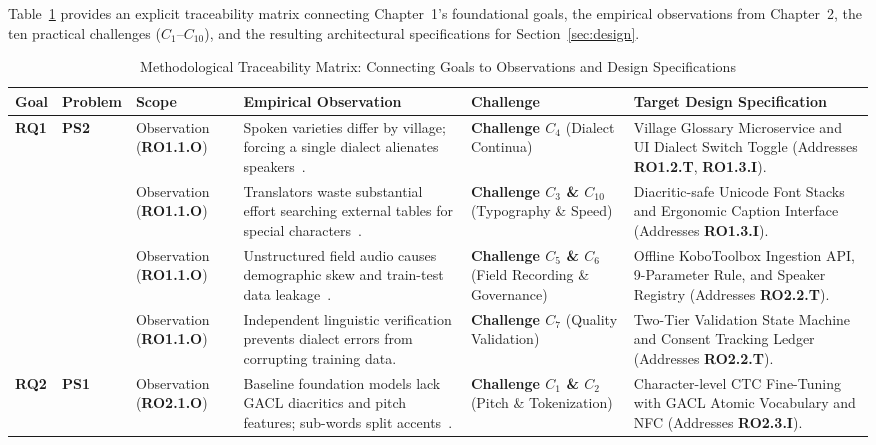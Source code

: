 \documentclass[conference]{IEEEtran}
\begin{document}
Table~\ref{tab:traceability_mapping} provides an explicit traceability matrix connecting Chapter~1's foundational goals, the empirical observations from Chapter~2, the ten practical challenges ($C_1$--$C_{10}$), and the resulting architectural specifications for Section~\ref{sec:design}.

\begin{table}[t]
\centering
\small
\setlength{\tabcolsep}{3.5pt}
\caption{Methodological Traceability Matrix: Connecting Goals to Observations and Design Specifications}
\label{tab:traceability_mapping}
\begin{tabular}{p{1.1cm} p{1.4cm} >{\raggedright\arraybackslash}p{2.2cm} >{\raggedright\arraybackslash}p{4.2cm} >{\raggedright\arraybackslash}p{2.6cm} >{\raggedright\arraybackslash}p{4.0cm}}
\toprule
\textbf{Goal} & \textbf{Problem} & \textbf{Scope} & \textbf{Empirical Observation} & \textbf{Challenge} & \textbf{Target Design Specification} \\
\midrule
\multirow{4}{*}{\textbf{RQ1}} & \multirow{4}{*}{\textbf{PS2}} & Observation (\textbf{RO1.1.O}) & Spoken varieties differ by village; forcing a single dialect alienates speakers~\cite{tadadjeu1979alphabet}. & \textbf{Challenge $C_4$} (Dialect Continua) & Village Glossary Microservice and UI Dialect Switch Toggle (Addresses \textbf{RO1.2.T}, \textbf{RO1.3.I}). \\
\addlinespace
& & Observation (\textbf{RO1.1.O}) & Translators waste substantial effort searching external tables for special characters~\cite{tadadjeu1979alphabet}. & \textbf{Challenge $C_3$ \& $C_{10}$} (Typography \& Speed) & Diacritic-safe Unicode Font Stacks and Ergonomic Caption Interface (Addresses \textbf{RO1.3.I}). \\
\addlinespace
& & Observation (\textbf{RO1.1.O}) & Unstructured field audio causes demographic skew and train-test data leakage~\cite{kobotoolbox2024}. & \textbf{Challenge $C_5$ \& $C_6$} (Field Recording \& Governance) & Offline KoboToolbox Ingestion API, 9-Parameter Rule, and Speaker Registry (Addresses \textbf{RO2.2.T}). \\
\addlinespace
& & Observation (\textbf{RO1.1.O}) & Independent linguistic verification prevents dialect errors from corrupting training data. & \textbf{Challenge $C_7$} (Quality Validation) & Two-Tier Validation State Machine and Consent Tracking Ledger (Addresses \textbf{RO2.2.T}). \\
\midrule
\multirow{4}{*}{\textbf{RQ2}} & \multirow{4}{*}{\textbf{PS1}} & Observation (\textbf{RO2.1.O}) & Baseline foundation models lack GACL diacritics and pitch features; sub-words split accents~\cite{radford2023robust}. & \textbf{Challenge $C_1$ \& $C_2$} (Pitch \& Tokenization) & Character-level CTC Fine-Tuning with GACL Atomic Vocabulary and NFC (Addresses \textbf{RO2.3.I}). \\

\end{tabular}
\end{table}
\end{document}
